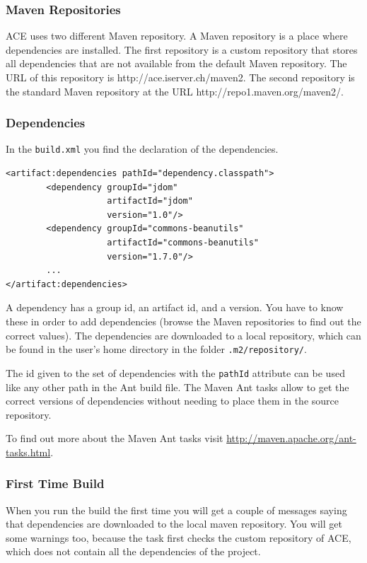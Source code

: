 \documentclass[11pt,a4paper]{article}
\begin{document}
\subsubsection{Maven Repositories}
ACE uses two different Maven repository. A Maven repository is a place where
dependencies are installed. The first repository is a custom repository that
stores all dependencies that are not available from the default Maven
repository. The URL of this repository is http://ace.iserver.ch/maven2. The
second repository is the standard Maven repository at the URL
http://repo1.maven.org/maven2/.

\subsubsection{Dependencies}
In the \texttt{build.xml} you find the declaration of the dependencies.

\small{
\begin{verbatim}
<artifact:dependencies pathId="dependency.classpath">
		<dependency groupId="jdom" 
		            artifactId="jdom" 
		            version="1.0"/>
		<dependency groupId="commons-beanutils" 
		            artifactId="commons-beanutils" 
		            version="1.7.0"/>
        ...
</artifact:dependencies>
\end{verbatim}
}

A dependency has a group id, an artifact id, and a version. You have to know
these in order to add dependencies (browse the Maven repositories to find
out the correct values). The dependencies are downloaded to a local repository,
which can be found in the user's home directory in the folder 
\texttt{.m2/repository/}.

The id given to the set of dependencies with the \texttt{pathId} attribute
can be used like any other path in the Ant build file. The Maven Ant tasks
allow to get the correct versions of dependencies without needing to place
them in the source repository.

To find out more about the Maven Ant tasks visit
\href{http://maven.apache.org/ant-tasks.html}{http://maven.apache.org/ant-tasks.html}.

\subsubsection{First Time Build}
When you run the build the first time you will get a couple of messages saying that dependencies are downloaded to the local maven repository. You will get 
some warnings too, because the task first checks the custom
repository of ACE, which does not contain all the dependencies of the project.
\end{document}
